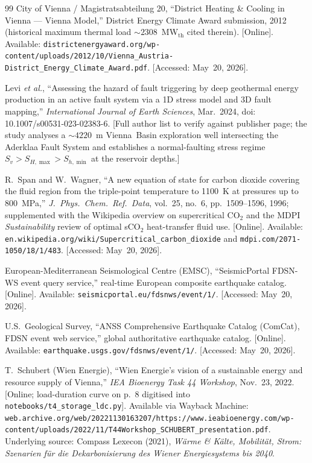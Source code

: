 \documentclass{article}
\begin{document}
\begin{thebibliography}{99}
City of Vienna / Magistratsabteilung 20, ``District Heating \& Cooling
in Vienna --- Vienna Model,'' District Energy Climate Award submission,
2012 (historical maximum thermal load $\sim 2308$~MW$_{\mathrm{th}}$ cited
therein). [Online]. Available:
\texttt{districtenergyaward.org/wp-content/uploads/2012/10/Vienna\_Austria-District\_Energy\_Climate\_Award.pdf}.
[Accessed: May~20, 2026].

Levi \emph{et al.}, ``Assessing the hazard of fault triggering by deep
geothermal energy production in an active fault system via a 1D stress
model and 3D fault mapping,'' \emph{International Journal of Earth
Sciences}, Mar.\ 2024, doi: 10.1007/s00531-023-02383-6. [Full author
list to verify against publisher page; the study analyses a $\sim 4220$~m
Vienna~Basin exploration well intersecting the Aderklaa Fault System and
establishes a normal-faulting stress regime $S_v > S_{H,\max} > S_{h,\min}$
at the reservoir depths.]

R.~Span and W.~Wagner, ``A new equation of state for carbon dioxide
covering the fluid region from the triple-point temperature to
1100~K at pressures up to 800~MPa,'' \emph{J.\ Phys.\ Chem.\ Ref.\ Data},
vol.~25, no.~6, pp.~1509--1596, 1996; supplemented with the Wikipedia
overview on supercritical CO$_2$ and the MDPI \emph{Sustainability}
review of optimal sCO$_2$ heat-transfer fluid use. [Online]. Available:
\texttt{en.wikipedia.org/wiki/Supercritical\_carbon\_dioxide} and
\texttt{mdpi.com/2071-1050/18/1/483}. [Accessed: May~20, 2026].

European-Mediterranean Seismological Centre (EMSC), ``SeismicPortal
FDSN-WS event query service,'' real-time European composite earthquake
catalog. [Online]. Available:
\texttt{seismicportal.eu/fdsnws/event/1/}.
[Accessed: May~20, 2026].

U.S.\ Geological Survey, ``ANSS Comprehensive Earthquake Catalog
(ComCat), FDSN event web service,'' global authoritative earthquake
catalog. [Online]. Available:
\texttt{earthquake.usgs.gov/fdsnws/event/1/}.
[Accessed: May~20, 2026].

T.~Schubert (Wien Energie), ``Wien Energie's vision of a sustainable
energy and resource supply of Vienna,'' \emph{IEA Bioenergy Task 44
Workshop}, Nov.\ 23, 2022. [Online; load-duration curve on p.~8 digitised
into \texttt{notebooks/t4\_storage\_ldc.py}]. Available via Wayback Machine:
\texttt{web.archive.org/web/20221130163207/https://www.ieabioenergy.com/wp-content/uploads/2022/11/T44Workshop\_SCHUBERT\_presentation.pdf}.
Underlying source: Compass Lexecon (2021), \emph{W\"arme \& K\"alte,
Mobilit\"at, Strom: Szenarien f\"ur die Dekarbonisierung des Wiener
Energiesystems bis 2040}.


\end{thebibliography}
\end{document}
